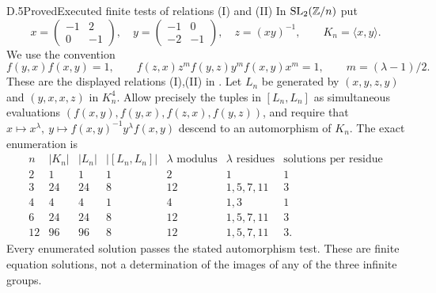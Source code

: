 \begin{statement}{D.5}{Proved}{Executed finite tests of relations (I) and (II)}
In \(\operatorname{SL}_2(\mathbb Z/n)\) put
\[
 x=\begin{pmatrix}-1&2\\0&-1\end{pmatrix},\quad
 y=\begin{pmatrix}-1&0\\-2&-1\end{pmatrix},\quad z=(xy)^{-1},
 \qquad K_n=\langle x,y\rangle .
\]
We use the convention
\[
 f(y,x)f(x,y)=1,\qquad
 f(z,x)z^m f(y,z)y^m f(x,y)x^m=1,\qquad m=(\lambda-1)/2.
 \tag{D.11}
\]
These are the displayed relations (I),(II) in
\citet[p.~19]{D_Schneps2012}.
Let \(L_n\) be generated by
\((x,y,z,y)\) and \((y,x,x,z)\) in \(K_n^4\).
Allow precisely the tuples in \([L_n,L_n]\) as simultaneous
evaluations
\((f(x,y),f(y,x),f(z,x),f(y,z))\), and require that
\(x\mapsto x^\lambda,\ y\mapsto f(x,y)^{-1}y^\lambda f(x,y)\)
descend to an automorphism of \(K_n\).
The exact enumeration is
\[
\begin{array}{c|rrrr|l|r}
n&|K_n|&|L_n|&|[L_n,L_n]|&\lambda\text{ modulus}
 &\lambda\text{ residues}&\text{solutions per residue}\\ \hline
2&1&1&1&2&1&1\\
3&24&24&8&12&1,5,7,11&3\\
4&4&4&1&4&1,3&1\\
6&24&24&8&12&1,5,7,11&3\\
12&96&96&8&12&1,5,7,11&3 .
\end{array}                                                   \tag{D.12}
\]
Every enumerated solution passes the stated automorphism test.
These are finite equation solutions, not a determination of the
images of any of the three infinite groups.
\end{statement}
